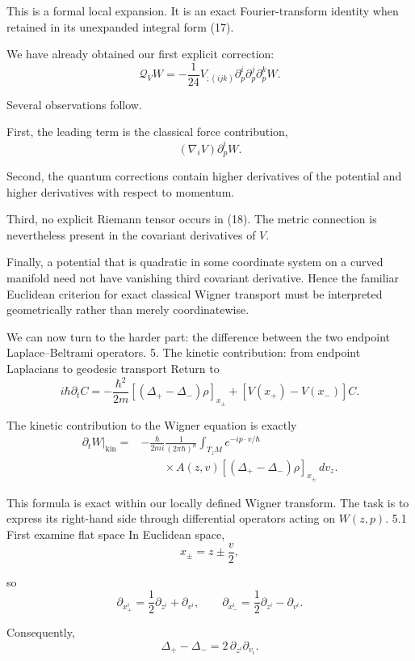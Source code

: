 This is a formal local expansion. It is an exact Fourier-transform identity when retained in its unexpanded integral form (17).

We have already obtained our first explicit correction:
\[
\boxed{
\mathcal Q_VW
=
-\frac1{24}
V_{;(ijk)}
\partial_p^i\partial_p^j\partial_p^kW.
}
\tag{20}
\]

Several observations follow.

First, the leading term is the classical force contribution,
\[
(\nabla_iV)\partial_p^iW.
\]

Second, the quantum corrections contain higher derivatives of the potential and higher derivatives with respect to momentum.

Third, no explicit Riemann tensor occurs in (18). The metric connection is nevertheless present in the covariant derivatives of \(V\).

Finally, a potential that is quadratic in some coordinate system on a curved manifold need not have vanishing third covariant derivative. Hence the familiar Euclidean criterion for exact classical Wigner transport must be interpreted geometrically rather than merely coordinatewise.

We can now turn to the harder part: the difference between the two endpoint Laplace–Beltrami operators.
5. The kinetic contribution: from endpoint Laplacians to geodesic transport
Return to
\[
i\hbar\partial_tC
=
-\frac{\hbar^2}{2m}
[(\Delta_+-\Delta_-)\rho]_{x_\pm}
+[V(x_+)-V(x_-)]C.
\]

The kinetic contribution to the Wigner equation is exactly
\[
\boxed{
\begin{aligned}
\left.\partial_tW\right|_{\mathrm{kin}}
={}&-\frac{\hbar}{2mi}
\frac1{(2\pi\hbar)^n}
\int_{T_zM}e^{-ip\cdot v/\hbar}\\
&\qquad\times A(z,v)
[(\Delta_+-\Delta_-)\rho]_{x_\pm}\,dv_z.
\end{aligned}
}
\tag{21}
\]

This formula is exact within our locally defined Wigner transform. The task is to express its right-hand side through differential operators acting on \(W(z,p)\).
5.1 First examine flat space
In Euclidean space,
\[
x_\pm=z\pm\frac v2,
\]

so
\[
\partial_{x_+^i}
=\frac12\partial_{z^i}+\partial_{v^i},
\qquad
\partial_{x_-^i}
=\frac12\partial_{z^i}-\partial_{v^i}.
\tag{22}
\]

Consequently,
\[
\boxed{
\Delta_+-\Delta_-
=
2\,\partial_{z^i}\partial_{v_i}.
}
\tag{23}
\]

